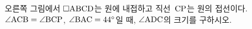 \noindent\begin{minipage}[t]{0.58\linewidth}\vspace{0pt}\raggedright 오른쪽 그림에서 $\square\mathrm{ABCD}$는 원에 내접하고 직선~$\mathrm{CP}$는 원의 접선이다. $\angle\mathrm{ACB}=\angle\mathrm{BCP}$, $\angle\mathrm{BAC}=44^\circ$일 때, $\angle\mathrm{ADC}$의 크기를 구하시오.\end{minipage}\hfill\begin{minipage}[t]{0.4\linewidth}\vspace{0pt}\centering \resizebox{\ifdim\width>\linewidth\linewidth\else\width\fi}{!}{}\end{minipage}\par
